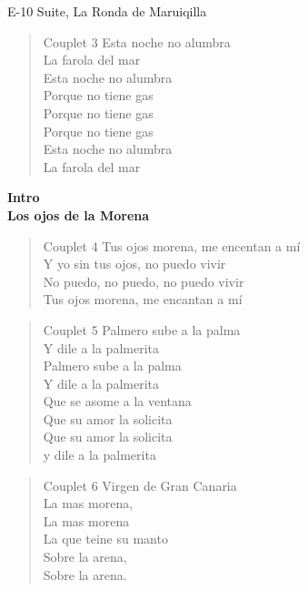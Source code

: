 \begin{song}[vals]{E-10 Suite, La Ronda de Maruiqilla}
\begin{verse}{Couplet 3}
\chord{}Esta noche no alumbra\\
La farola del mar\\
\chord{}Esta noche no alumbra\\
Porque no tiene gas\\
\chord{}Porque no tiene gas\\
\chord{}Porque no tiene gas\\
\chord{}Esta noche no alumbra\\
La farola del mar\\
\end{verse}
\textbf{Intro}\\
\vspace{1em}
\textbf{Los ojos de la Morena}\\
\begin{verse}{Couplet 4}
Tus ojos morena, me encentan a mí\\
\chord{}Y yo sin tus ojos, no puedo vivir \\
No puedo, no puedo, no puedo vivir\\
\chord{}Tus ojos morena, me encantan a mí\\
\end{verse}


\begin{verse}{Couplet 5}
Palmero sube a la palma\\
Y dile a la palmerita\\
Palmero sube a la palma\\
Y dile a la palmerita\\
Que se asome a la ventana\\
Que su amor la solicita\\
Que su amor la solicita\\
y dile a la palmerita\\
\end{verse}

\begin{verse}{Couplet 6}
Virgen de Gran Cana\chord{}ria\\
\chord{}La mas morena,\\
La mas morena\\
La que teine su manto\\
\chord{}Sobre la arena,\\
Sobre la arena.\
\end{verse}


\end{song}
